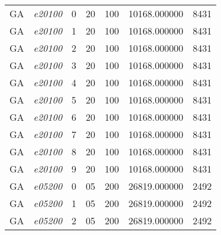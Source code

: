 {\begin{longtable}{cc|c|cc|cc}
			GA                 & \textit{e20100}    & 0                               & 20               & 100              & 10168.000000                          & 8431 \\ 
			GA                 & \textit{e20100}    & 1                               & 20               & 100              & 10168.000000                          & 8431 \\ 
			GA                 & \textit{e20100}    & 2                               & 20               & 100              & 10168.000000                          & 8431 \\ 
			GA                 & \textit{e20100}    & 3                               & 20               & 100              & 10168.000000                          & 8431 \\ 
			GA                 & \textit{e20100}    & 4                               & 20               & 100              & 10168.000000                          & 8431 \\ 
			GA                 & \textit{e20100}    & 5                               & 20               & 100              & 10168.000000                          & 8431 \\ 
			GA                 & \textit{e20100}    & 6                               & 20               & 100              & 10168.000000                          & 8431 \\ 
			GA                 & \textit{e20100}    & 7                               & 20               & 100              & 10168.000000                          & 8431 \\ 
			GA                 & \textit{e20100}    & 8                               & 20               & 100              & 10168.000000                          & 8431 \\ 
			GA                 & \textit{e20100}    & 9                               & 20               & 100              & 10168.000000                          & 8431 \\ \hline
			GA                 & \textit{e05200}    & 0                               & 05               & 200              & 26819.000000                          & 2492 \\ 
			GA                 & \textit{e05200}    & 1                               & 05               & 200              & 26819.000000                          & 2492 \\ 
			GA                 & \textit{e05200}    & 2                               & 05               & 200              & 26819.000000                          & 2492 \\ 

\end{longtable}}
